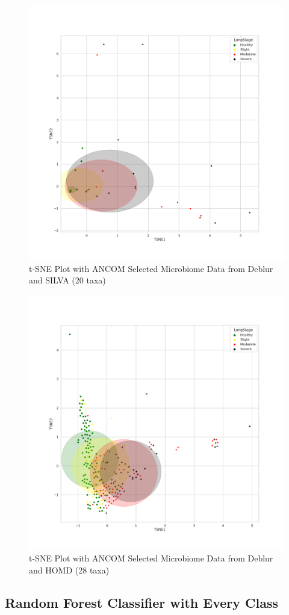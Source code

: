 \documentclass[a4paper]{article}
\begin{document}
            \begin{figure}[p]
                \centering
                \includegraphics[width=0.6 \linewidth]{figures/tSNE/ANCOM/ANCOM.Deblur.silva.png}
                \caption{t-SNE Plot with ANCOM Selected Microbiome Data from Deblur and SILVA (20 taxa)}
                \label{fig:tsne-ANCOM-deblur-silva}
            \end{figure}

            \begin{figure}[p]
                \centering
                \includegraphics[width=0.6 \linewidth]{figures/tSNE/ANCOM/ANCOM.Deblur.homd.png}
                \caption{t-SNE Plot with ANCOM Selected Microbiome Data from Deblur and HOMD (28 taxa)}
                \label{fig:tsne-ANCOM-deblur-homd}
            \end{figure}

        \subsection{Random Forest Classifier with Every Class}
\end{document}
